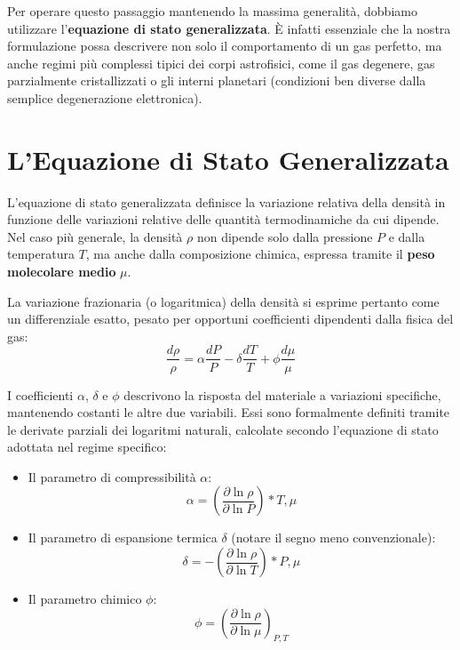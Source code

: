 Per operare questo passaggio mantenendo la massima generalità, dobbiamo utilizzare l'\textbf{equazione di stato generalizzata}. È infatti essenziale che la nostra formulazione possa descrivere non solo il comportamento di un gas perfetto, ma anche regimi più complessi tipici dei corpi astrofisici, come il gas degenere, gas parzialmente cristallizzati o gli interni planetari (condizioni ben diverse dalla semplice degenerazione elettronica).

\section{L'Equazione di Stato Generalizzata}

L'equazione di stato generalizzata definisce la variazione relativa della densità in funzione delle variazioni relative delle quantità termodinamiche da cui dipende. Nel caso più generale, la densità $\rho$ non dipende solo dalla pressione $P$ e dalla temperatura $T$, ma anche dalla composizione chimica, espressa tramite il \textbf{peso molecolare medio} $\mu$.

La variazione frazionaria (o logaritmica) della densità si esprime pertanto come un differenziale esatto, pesato per opportuni coefficienti dipendenti dalla fisica del gas:
\begin{equation}
\frac{d\rho}{\rho} = \alpha \frac{dP}{P} - \delta \frac{dT}{T} + \phi \frac{d\mu}{\mu}
\end{equation}

I coefficienti $\alpha$, $\delta$ e $\phi$ descrivono la risposta del materiale a variazioni specifiche, mantenendo costanti le altre due variabili. Essi sono formalmente definiti tramite le derivate parziali dei logaritmi naturali, calcolate secondo l'equazione di stato adottata nel regime specifico:
\begin{itemize}
\item Il parametro di compressibilità \textbf{$\alpha$}:
\begin{equation}
\alpha = \left( \frac{\partial \ln \rho}{\partial \ln P} \right)*{T, \mu}
\end{equation}
\item Il parametro di espansione termica \textbf{$\delta$} (notare il segno meno convenzionale):
\begin{equation}
\delta = - \left( \frac{\partial \ln \rho}{\partial \ln T} \right)*{P, \mu}
\end{equation}
\item Il parametro chimico \textbf{$\phi$}:
\begin{equation}
\phi = \left( \frac{\partial \ln \rho}{\partial \ln \mu} \right)_{P, T}
\end{equation}
\end{itemize}

